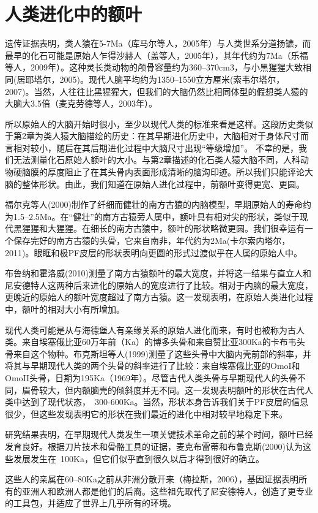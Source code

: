 \section{人类进化中的额叶}
遗传证据表明，类人猿在5-7Ma（库马尔等人，2005年）与人类世系分道扬镳，而最早的化石可能是原始人乍得沙赫人（盖等人，2005年），其年代约为7Ma（乐福等人，2009年）。这种灵长类动物的颅骨容量约为360–370cm3，与小黑猩猩大致相同(居耶塔尔，2005)。现代人脑平均约为1350–1550立方厘米(索韦尔塔尔，2007)。当然，人往往比黑猩猩大，但我们的大脑仍然比相同体型的假想类人猿的大脑大3.5倍（麦克劳德等人，2003年）。
\par
所以原始人的大脑开始时很小，至少以现代人类的标准来看是这样。这段历史类似于第2章为类人猿大脑描绘的历史：在其早期进化历史中，大脑相对于身体尺寸而言相对较小，随后在其后期进化过程中大脑尺寸出现“等级增加”。
不幸的是，我们无法测量化石原始人额叶的大小。与第2章描述的化石类人猿大脑不同，人科动物硬脑膜的厚度阻止了在其头骨内表面形成清晰的脑沟印迹。所以我们只能评论大脑的整体形状。由此，我们知道在原始人进化过程中，前额叶变得更宽、更圆。
\par
福尔克等人(2000)制作了纤细而健壮的南方古猿的内脑模型，早期原始人的寿命约为1.5–2.5Ma。在“健壮”的南方古猿旁人属中，额叶具有相对尖的形状，类似于现代黑猩猩和大猩猩。在细长的南方古猿中，额叶的形状略微更圆。我们很幸运有一个保存完好的南方古猿的头骨，它来自南非，年代约为2Ma(卡尔索内塔尔，2011)。眼眶和极PF皮层的形状表明向更圆的形式过渡似乎在人属的原始人中。
\par
布鲁纳和霍洛威(2010)测量了南方古猿额叶的最大宽度，并将这一结果与直立人和尼安德特人这两种后来进化的原始人的宽度进行了比较。相对于内脑的最大宽度，更晚近的原始人的额叶宽度超过了南方古猿。这一发现表明，在原始人类进化过程中，额叶的相对大小有所增加。
\par
现代人类可能是从与海德堡人有亲缘关系的原始人进化而来，有时也被称为古人类。来自埃塞俄比亚60万年前（Ka）的博多头骨和来自赞比亚300Ka的卡布韦头骨来自这个物种。布克斯坦等人(1999)测量了这些头骨中大脑内壳前部的斜率，并将其与早期现代人类的两个头骨的斜率进行了比较：来自埃塞俄比亚的OmoI和OmoII头骨，日期为195Ka（1969年）。尽管古代人类头骨与早期现代人的头骨不同，眉骨较大，但内额脑壳的倾斜度并无不同。这一发现表明额叶的形状在古代人类中达到了现代状态，~300-600Ka。当然，形状本身告诉我们关于PF皮层的信息很少，但这些发现表明它的形状在我们最近的进化中相对较早地稳定下来。
\par
研究结果表明，在早期现代人类发生一项关键技术革命之前的某个时间，额叶已经发育良好。根据刀片技术和骨骼工具的证据，麦克布雷蒂和布鲁克斯(2000)认为这些发展发生在~100Ka，但它们似乎直到很久以后才得到很好的确立。
\par
这些人的亲属在60–80Ka之前从非洲分散开来（梅拉斯，2006），基因证据表明所有的亚洲人和欧洲人都是他们的后裔。这些祖先取代了尼安德特人，创造了更专业的工具包，并适应了世界上几乎所有的环境。
